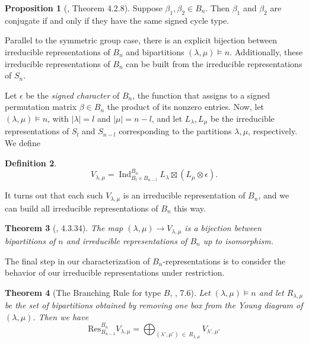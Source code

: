 \documentclass{amsart}
\theoremstyle{plain}
\newtheorem{theorem}{Theorem}[section]
\theoremstyle{definition}
\newtheorem{definition}[theorem]{Definition}
\newtheorem{proposition}[theorem]{Proposition}
\DeclareMathOperator{\Ind}{Ind}
\begin{document}
\begin{proposition}
 [\cite{jameskerber84}, Theorem 4.2.8] Suppose $\beta_1,\beta_2\in B_n.$ Then $\beta_1$ and $\beta_2$ are conjugate if and only if they have the same signed cycle type. 
\end{proposition}

Parallel to the symmetric group case, there is an explicit bijection between irreducible representations of $B_n$ and bipartitions $(\lambda,\mu)\vDash n.$ Additionally, these irreducible representations of $B_n$ can be built from the irreducible representations of $S_n. $


Let $\epsilon$ be the \textit{signed character} of $B_n$, the function that assigns to a signed permutation matrix $\beta \in B_n$ the product of its nonzero entries. Now, let $(\lambda, \mu) \vDash n$, with $|\lambda| = l$ and $|\mu| = n-l$, and let $L_{\lambda}, L_{\mu}$ be the irreducible representations of $S_l$ and $S_{n-l}$ corresponding to the partitions $\lambda, \mu$, respectively. We define 
\begin{definition}\label{V_{lambda,mu}}
$$V_{\lambda, \mu} = \Ind_{B_{l} \times B_{n-l}}^{B_n} L_{\lambda} \boxtimes (L_{\mu} \otimes \epsilon). $$
\end{definition}

It turns out that each such $V_{\lambda, \mu}$ is an irreducible representation of $B_n$, and we can build all irreducible representations of $B_n$ this way. 

\begin{theorem}[\cite{jameskerber84}, 4.3.34] \label{specificSchurWeyl}
 The map $(\lambda,\mu)\to V_{\lambda,\mu}$ is a bijection between bipartitions of $n$ and irreducible representations of $B_n$ up to isomorphism. 
\end{theorem}

The final step in our characterization of $B_n$-representations is to consider the behavior of our irreducible representations under restriction. 



\begin{theorem}[The Branching Rule for type $B$, \cite{Zelevinsky1981}, 7.6] 

Let $(\lambda,\mu)\vDash n$ and let $R_{\lambda, \mu}$ be the set of bipartitions obtained by removing one box from the Young diagram of $(\lambda, \mu)$. Then we have 
$$\mathrm{Res}_{B_{n-1}}^{B_n}  V_{\lambda, \mu}  = 
\bigoplus_{(\lambda', \mu')  \ \in \ R_{\lambda, \mu}} V_{\lambda', \mu'} $$ 
\end{theorem}
\end{document}
